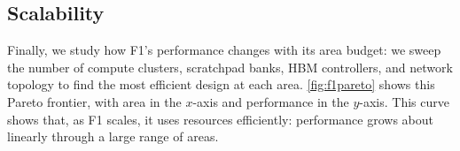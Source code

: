 \figFOneConfigs

\subsection{Scalability}
\label{sec:scalability}

Finally, we study how F1's performance changes with its area budget: 
we sweep the number of compute clusters, scratchpad banks, HBM controllers,
and network topology to find the most efficient design at each area.
\autoref{fig:f1pareto} shows this
Pareto frontier, with
area in the $x$-axis and performance in the $y$-axis.
This curve shows that, as F1 scales, it uses resources efficiently:
performance grows about linearly through a large range of areas.





